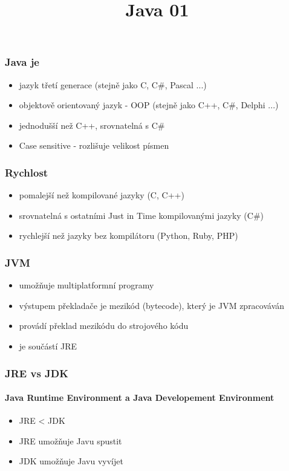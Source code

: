 \documentclass[nologo]{slides}
\title{Java 01}
\author[Lukáš Němec]{%
    \makebox[0.5\textwidth][l]{\textbf{Lukáš Němec}}\\%
    \vskip 1em
    \vskip 1em
}
\begin{document}
\maketitle

\begin{frame}
    \frametitle{Java je}

    \begin{itemize}
        \item jazyk třetí generace (stejně jako C, C#, Pascal ...)
        \item objektově orientovaný jazyk - OOP (stejně jako C++, C#, Delphi ...)
        \item jednodušší než C++, srovnatelná s C#
        \item Case sensitive - rozlišuje velikost písmen
    \end{itemize}

\end{frame}

\begin{frame}
    \frametitle{Rychlost}

    \begin{itemize}
        \item pomalejší než kompilované jazyky (C, C++)
        \item srovnatelná s ostatními Just in Time kompilovanými jazyky (C#)
        \item rychlejší než jazyky bez kompilátoru (Python, Ruby, PHP)
    \end{itemize}

\end{frame}

\begin{frame}
    \frametitle{JVM}

    \begin{itemize}
        \item umožňuje multiplatformní programy
        \item výstupem překladače je mezikód (bytecode), který je JVM zpracováván
        \item provádí překlad mezikódu do strojového kódu
        \item je součástí JRE
    \end{itemize}

\end{frame}

\begin{frame}
    \frametitle{JRE vs JDK}
    \framesubtitle{Java Runtime Environment a Java Developement Environment}
    \begin{itemize}
        \item JRE < JDK
        \item JRE umožňuje Javu spustit
        \item JDK umožňuje Javu vyvíjet
    \end{itemize}

\end{frame}
\end{document}
